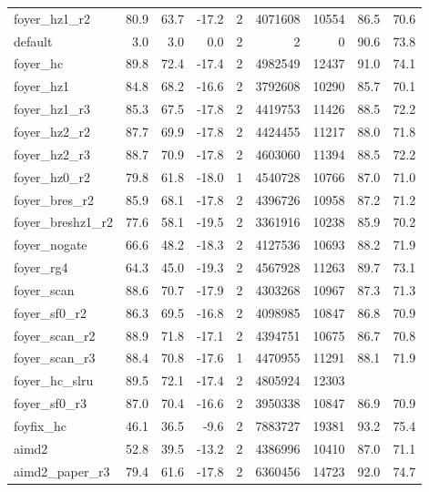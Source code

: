 \documentclass[10pt]{article}
\begin{document}
\begin{landscape}
\begin{center}
\begin{tabular}{lrrrrrrrr}
foyer\_hz1\_r2 & 80.9 & 63.7 & -17.2 & 2 & 4071608 & 10554 & 86.5 & 70.6 \\
default & 3.0 & 3.0 & 0.0 & 2 & 2 & 0 & 90.6 & 73.8 \\
foyer\_hc & 89.8 & 72.4 & -17.4 & 2 & 4982549 & 12437 & 91.0 & 74.1 \\
foyer\_hz1 & 84.8 & 68.2 & -16.6 & 2 & 3792608 & 10290 & 85.7 & 70.1 \\
foyer\_hz1\_r3 & 85.3 & 67.5 & -17.8 & 2 & 4419753 & 11426 & 88.5 & 72.2 \\
foyer\_hz2\_r2 & 87.7 & 69.9 & -17.8 & 2 & 4424455 & 11217 & 88.0 & 71.8 \\
foyer\_hz2\_r3 & 88.7 & 70.9 & -17.8 & 2 & 4603060 & 11394 & 88.5 & 72.2 \\
foyer\_hz0\_r2 & 79.8 & 61.8 & -18.0 & 1 & 4540728 & 10766 & 87.0 & 71.0 \\
foyer\_bres\_r2 & 85.9 & 68.1 & -17.8 & 2 & 4396726 & 10958 & 87.2 & 71.2 \\
foyer\_breshz1\_r2 & 77.6 & 58.1 & -19.5 & 2 & 3361916 & 10238 & 85.9 & 70.2 \\
foyer\_nogate & 66.6 & 48.2 & -18.3 & 2 & 4127536 & 10693 & 88.2 & 71.9 \\
foyer\_rg4 & 64.3 & 45.0 & -19.3 & 2 & 4567928 & 11263 & 89.7 & 73.1 \\
foyer\_scan & 88.6 & 70.7 & -17.9 & 2 & 4303268 & 10967 & 87.3 & 71.3 \\
foyer\_sf0\_r2 & 86.3 & 69.5 & -16.8 & 2 & 4098985 & 10847 & 86.8 & 70.9 \\
foyer\_scan\_r2 & 88.9 & 71.8 & -17.1 & 2 & 4394751 & 10675 & 86.7 & 70.8 \\
foyer\_scan\_r3 & 88.4 & 70.8 & -17.6 & 1 & 4470955 & 11291 & 88.1 & 71.9 \\
foyer\_hc\_slru & 89.5 & 72.1 & -17.4 & 2 & 4805924 & 12303 &  &  \\
foyer\_sf0\_r3 & 87.0 & 70.4 & -16.6 & 2 & 3950338 & 10847 & 86.9 & 70.9 \\
foyfix\_hc & 46.1 & 36.5 & -9.6 & 2 & 7883727 & 19381 & 93.2 & 75.4 \\
aimd2 & 52.8 & 39.5 & -13.2 & 2 & 4386996 & 10410 & 87.0 & 71.1 \\
aimd2\_paper\_r3 & 79.4 & 61.6 & -17.8 & 2 & 6360456 & 14723 & 92.0 & 74.7 \\
\bottomrule
\end{tabular}\end{center}\end{landscape}
\end{document}
